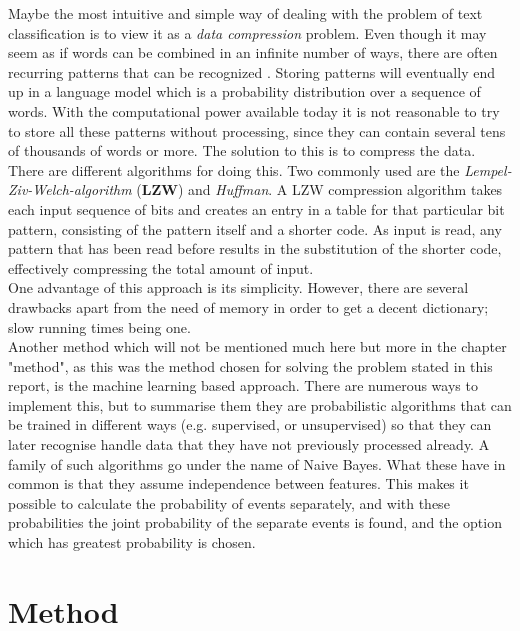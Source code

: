 \documentclass[a4paper]{article}
\begin{document}
\noindent Maybe the most intuitive and simple way of dealing with the problem of text classification is to view it as a \textit{data compression} problem. Even though it may seem as if words can be combined in an infinite number of ways, there are often recurring patterns that can be recognized \cite{AI}. Storing patterns will eventually end up in a language model \cite{ColumbiaUniversity} which is a probability distribution over a sequence of words. With the computational power available today it is not reasonable to try to store all these patterns without processing, since they can contain several tens of thousands of words or more. The solution to this is to compress the data. There are different algorithms for doing this. Two commonly used are the \textit{Lempel-Ziv-Welch-algorithm} (\textbf{LZW}) and \textit{Huffman}\cite{handouts}. A LZW compression algorithm takes each input sequence of bits and creates an entry in a table for that particular bit pattern, consisting of the pattern itself and a shorter code. As input is read, any pattern that has been read before results in the substitution of the shorter code, effectively compressing the total amount of input.\\One advantage of this approach is its simplicity. However, there are several drawbacks apart from the need of memory in order to get a decent dictionary; slow running times being one\cite{hstein}. \\

\noindent Another method which will not be mentioned much here but more in the chapter "method", as this was the method chosen for solving the problem stated in this report, is the machine learning based approach. There are numerous ways to implement this, but to summarise them they are probabilistic algorithms that can be trained in different ways (e.g. supervised, or unsupervised) so that they can later recognise handle data that they have not previously processed already. A family of such algorithms go under the name of Naive Bayes. What these have in common is that they assume independence between features. This makes it possible to calculate the probability of events separately, and with these probabilities the joint probability of the separate events is found, and the option which has greatest probability is chosen.



 


\section{Method}  
\end{document}
